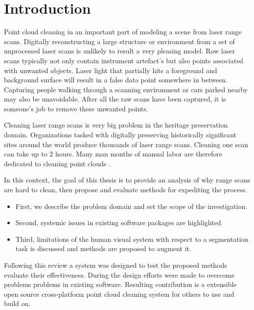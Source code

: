 \chapter{Introduction}\label{ch:intro}
Point cloud cleaning in an important part of modeling a scene from laser range scans. Digitally reconstructing a large structure or environment from a set of unprocessed laser scans is unlikely to result a very pleasing model. Raw laser scans typically not only contain instrument artefact's but also points associated with unwanted objects. Laser light that partially hits a foreground and background surface will result in a false data point somewhere in between. Capturing people walking through a scanning environment or cars parked nearby may also be unavoidable. After all the raw scans have been captured, it is someone's job to remove these unwanted points.

Cleaning laser range scans is very big problem in the heritage preservation domain. Organizations tasked with digitally preserving historically significant sites around the world produce thousands of laser range scans. Cleaning one scan can take up to 2 hours. Many man months of manual labor are therefore dedicated to cleaning point clouds \cite{Ruther2011}.

In this context, the goal of this thesis is to provide an analysis of why range scans are hard to clean, then propose and evaluate methods for expediting the process.

\begin{itemize}
	\item First, we describe the problem domain and set the scope of the investigation.
	\item Second, systemic issues in existing software packages are highlighted
	\item Third, limitations of the human visual system with respect to a segmentation task is discussed and methods are proposed to augment it. 
\end{itemize}

Following this review a system was designed to test the proposed methods evaluate their effectiveness. During the design efforts were made to overcome problems problems in existing software. Resulting contribution is a extensible open source cross-platform point cloud cleaning system for others to use and build on.